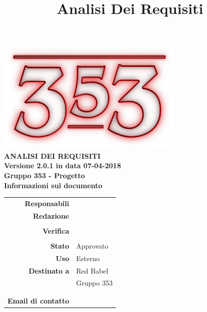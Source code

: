 \documentclass[openany, a4paper, 12pt]{report}
\title{Analisi Dei Requisiti}
\begin{document}
\begin{titlepage}
	\centering
	\vfill
	{
		\bfseries
		\vskip2cm
		\includegraphics[width=9cm]{../../common/images/logo.png} \\
		\vfill
		\Huge{ANALISI DEI REQUISITI}\\
		\vfill
		\Large Versione 2.0.1 in data 07-04-2018\\
		\large Gruppo 353 - Progetto \progetto \\
		\vfill
\normalsize Informazioni sul documento\\

\begin{table}[htbp]
	\centering
	\renewcommand\arraystretch{1.2}
	\begin{tabular}{r|l}
		\hline
		\textbf{Responsabili}	& \Riccardo \\
								
		
		\textbf{Redazione} 		& \Davide\\
								& \Valentina\\
		
		\textbf{Verifica} 		& \Elena\\
								& \Parwinder\\
						
		\textbf{Stato} 			& Approvato\\
		\textbf{Uso}			& Esterno\\
		\textbf{Destinato a}   	& Red Babel\\
								& Gruppo 353\\
								& \Vardanega\\
								& \Cardin\\
		
						
			\textbf{Email di contatto}	& \mailgroup
	\end{tabular}
\end{table}
		\vfill
	}    
\end{titlepage}

\tableofcontents
\listoffigures

\listoftables

\newpage
{}




 
\end{document}
